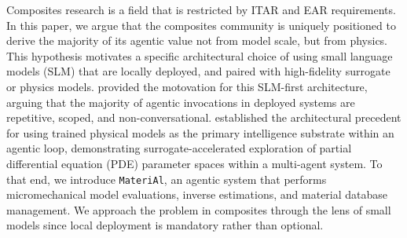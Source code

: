 \documentclass[preprint,review,10pt,number]{elsarticle}
\begin{document}
Composites research is a field that is restricted by ITAR and EAR requirements.
In this paper, we argue that the composites community is uniquely positioned to 
derive the majority of its agentic value not from model scale, but from physics.
This hypothesis motivates a specific architectural choice of using small language models (SLM) that are locally deployed, and paired with high-fidelity surrogate or physics models.
\citet{belcak2025slm} provided the motovation for this SLM-first  architecture, arguing that the majority of agentic invocations in deployed systems are repetitive, scoped, and non-conversational.
\citet{vishwasrao2026agentic} established the architectural precedent for using trained physical models as the primary intelligence substrate within an agentic loop, demonstrating surrogate-accelerated exploration of partial differential equation (PDE) parameter spaces within a multi-agent system.
To that end, we introduce \texttt{MateriAl}, an agentic system that performs micromechanical model evaluations, inverse estimations, and material database management.
We approach the problem in composites through the lens of small models since local deployment is mandatory rather than optional.
\end{document}

